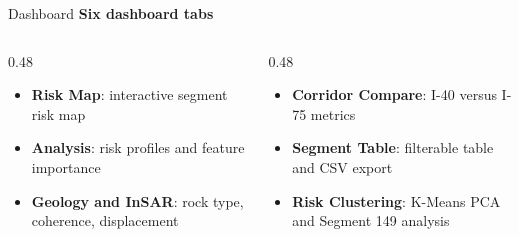 \documentclass[aspectratio=169,11pt]{beamer}
\newcommand{\slideheading}[1]{\vspace{0.05cm}\textbf{#1}\vspace{0.12cm}}
\begin{document}
\begin{frame}{Dashboard}
\slideheading{Six dashboard tabs}
\footnotesize
\begin{columns}[T,onlytextwidth]
\begin{column}{0.48\textwidth}
\begin{itemize}\setlength\itemsep{0.35em}
  \item \textbf{Risk Map}: interactive segment risk map
  \item \textbf{Analysis}: risk profiles and feature importance
  \item \textbf{Geology and InSAR}: rock type, coherence, displacement
\end{itemize}
\end{column}
\begin{column}{0.48\textwidth}
\begin{itemize}\setlength\itemsep{0.35em}
  \item \textbf{Corridor Compare}: I-40 versus I-75 metrics
  \item \textbf{Segment Table}: filterable table and CSV export
  \item \textbf{Risk Clustering}: K-Means PCA and Segment 149 analysis
\end{itemize}
\end{column}
\end{columns}
\vspace{0.45cm}
\begin{center}
\end{center}
\end{frame}
\end{document}
